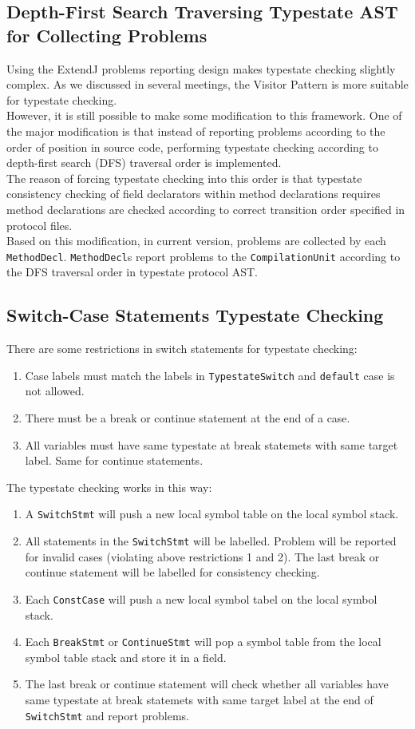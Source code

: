 \documentclass[]{article}
\begin{document}
\subsection{Depth-First Search Traversing Typestate AST for Collecting Problems}
Using the ExtendJ problems reporting design makes typestate checking slightly complex. As we discussed in several meetings, the Visitor Pattern is more suitable for typestate checking. \\[0.2cm]
However, it is still possible to make some modification to this framework. One of the major modification is that instead of reporting problems according to the order of position in source code, performing typestate checking according to depth-first search (DFS) traversal order is implemented. \\[0.2cm]
The reason of forcing typestate checking into this order is that typestate consistency checking of field declarators within method declarations requires method declarations are checked according to correct transition order specified in protocol files. \\[0.2cm]
Based on this modification, in current version, problems are collected by each \texttt{MethodDecl}. \texttt{MethodDecl}s report problems to the \texttt{CompilationUnit} according to the DFS traversal order in typestate protocol AST. 

\subsection{Switch-Case Statements Typestate Checking}
There are some restrictions in switch statements for typestate checking:
\begin{enumerate}
	\item Case labels must match the labels in \texttt{TypestateSwitch} and \texttt{default} case is not allowed.
	\item There must be a break or continue statement at the end of a case.
	\item All variables must have same typestate at break statemets with same target label. Same for continue statements.
\end{enumerate}
The typestate checking works in this way:
\begin{enumerate}
	\item A \texttt{SwitchStmt} will push a new local symbol table on the local symbol stack.
	\item All statements in the \texttt{SwitchStmt} will be labelled. Problem will be reported for invalid cases (violating above restrictions 1 and 2). The last break or continue statement will be labelled for consistency checking.
	\item Each \texttt{ConstCase} will push a new local symbol tabel on the local symbol stack.
	\item Each \texttt{BreakStmt} or \texttt{ContinueStmt} will pop a symbol table from the local symbol table stack and store it in a field.
	\item The last break or continue statement will check whether all variables have same typestate at break statemets with same target label at the end of \texttt{SwitchStmt} and report problems.
\end{enumerate}
\end{document}
